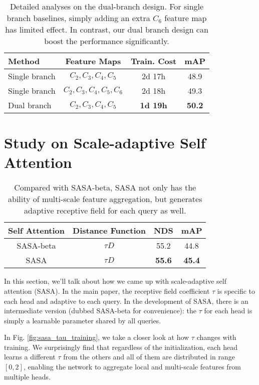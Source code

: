 \documentclass[10pt,twocolumn,letterpaper]{article}
\begin{document}
\begin{table}[t]
  \centering
  \begin{tabular}{l|c|c|c}
     \toprule
     Method & Feature Maps & Train. Cost & mAP \\
     \midrule
     Single branch & $C_2, C_3, C_4, C_5$ & 2d 17h & 48.9 \\
     Single branch & $C_2, C_3, C_4, C_5, C_6$ & 2d 18h & 49.3 \\
     Dual branch & $C_2, C_3, C_4, C_5$ & \textbf{1d 19h} & \textbf{50.2} \\
     \bottomrule
  \end{tabular}
  \caption{Detailed analyses on the dual-branch design. For single branch baselines, simply adding an extra $C_6$ feature map has limited effect. In contrast, our dual branch design can boost the performance significantly.}
  \label{table:dual_branch_c6}
\end{table}  

\section{Study on Scale-adaptive Self Attention}

\begin{table}[t]
  \centering
  \begin{tabular}{c|c|cc}
    \toprule
    Self Attention & Distance Function & NDS & mAP \\
    \midrule
    SASA-beta & $\tau D$ & 55.2 & 44.8 \\
    SASA      & $\tau D$ & \textbf{55.6} & \textbf{45.4} \\
    \bottomrule
  \end{tabular}
  \caption{Compared with SASA-beta, SASA not only has the ability of multi-scale feature aggregation, but generates adaptive receptive field for each query as well.}
  \label{table:sasa_beta}
\end{table}

In this section, we'll talk about how we came up with scale-adaptive self attention (SASA).
In the main paper, the receptive field coefficient $\tau$ is specific to each head and adaptive to each query. In the development of SASA, there is an intermediate version (dubbed SASA-beta for convenience): the $\tau$ for each head is simply a learnable parameter shared by all queries. 

In Fig. \ref{fig:sasa_tau_training}, we take a closer look at how $\tau$ changes with training. We surprisingly find that regardless of the initialization, each head learns a different $\tau$ from the others and all of them are distributed in range $[0, 2]$, enabling the network to aggregate local and multi-scale features from multiple heads.
\end{document}

